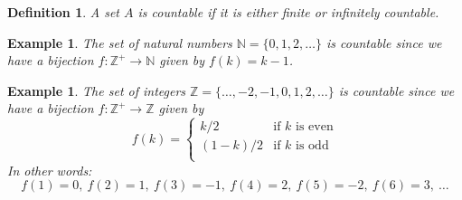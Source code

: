 \documentclass[11pt, letterpaper, oneside]{report}
\theoremstyle{pplain}
\newtheorem{ITERMVALUE THM}[theorem]{Intermediate Value Theorem}
\newtheorem{HEINEBOREL THM}[theorem]{Heine-Borel Theorem}
\newtheorem{UMETR THM}[theorem]{Urysohn Metrization Theorem}
\newtheorem{UMETR2 THM}[theorem]{Urysohn Metrization Theorem (v.2)}
\theoremstyle{ddefinition}
\newtheorem{definition}[theorem]{Definition}
\newtheorem{example}[theorem]{Example}
\theoremstyle{nnn}
\newtheorem{TDA NN}[theorem]{Topological Data Analysis. }
\theoremstyle{eexercise}
\newcommand{\N}{{\mathbb N}}
\newcommand{\Z}{{\mathbb Z}}
\begin{document}
\begin{definition}
A set $A$ is \emph{countable} if it is either finite or infinitely countable. 
\end{definition}


\begin{example}
The set of natural numbers $\N = \{0, 1, 2, \dots\}$ is  countable since we have a bijection
$f\colon \Z^{+} \to \N$ given by $f(k) = k-1$. 
\end{example}


\begin{example}
The set of integers $\Z = \{\dots, -2, -1, 0, 1, 2, \dots\}$ is countable since we have a bijection
$f\colon \Z^{+} \to \Z$ given by 
$$f(k) = 
\begin{cases}
k/2 & \text{if $k$ is even} \\
(1-k)/2 & \text{if $k$ is odd} \\
\end{cases}
$$
In other words:
$$f(1) = 0, \ f(2) = 1,\ f(3) = -1, \ f(4) = 2,\  f(5) = -2, \ f(6) = 3, \ \dots$$
\end{example}
\end{document}
